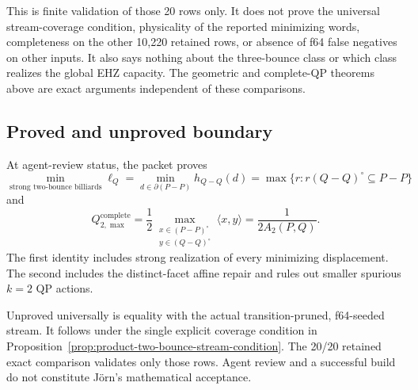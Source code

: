 This is finite validation of those 20 rows only.  It does not prove the
universal stream-coverage condition, physicality of the reported minimizing
words, completeness on the other 10,220 retained rows, or absence of f64
false negatives on other inputs.  It also says nothing about the
three-bounce class or which class realizes the global EHZ capacity.  The
geometric and complete-QP theorems above are exact arguments independent of
these comparisons.

\subsection{Proved and unproved boundary}
\label{subsec:product-two-bounce-conclusion}

At agent-review status, the packet proves
\[
 \boxed{
 \min_{\text{strong two-bounce billiards}}\ell_Q
 =\min_{d\in\partial(P-P)}h_{Q-Q}(d)
 =\max\{r:r(Q-Q)^\circ\subseteq P-P\}
 }
\]
and
\[
 \boxed{
 Q_{2,\max}^{\mathrm{complete}}
 =\frac12
   \max_{\substack{x\in(P-P)^\circ\\y\in(Q-Q)^\circ}}
   \langle x,y\rangle
 =\frac1{2A_2(P,Q)}.
 }
\]
The first identity includes strong realization of every minimizing
displacement.  The second includes the distinct-facet affine repair and rules
out smaller spurious \(k=2\) QP actions.

Unproved universally is equality with the actual transition-pruned,
f64-seeded stream.  It follows under the single explicit coverage condition
in Proposition~\ref{prop:product-two-bounce-stream-condition}.  The 20/20
retained exact comparison validates only those rows.  Agent review and a
successful build do not constitute Jörn's mathematical acceptance.
